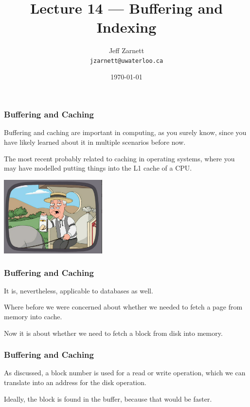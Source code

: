 

\title{Lecture 14 --- Buffering and Indexing }

\author{Jeff Zarnett \\ \small \texttt{jzarnett@uwaterloo.ca}}
\date{\today}




\begin{frame}
  \titlepage

 \end{frame}
 

\begin{frame}
\frametitle{Buffering and Caching}

Buffering and caching are important in computing, as you surely know, since you have likely learned about it in multiple scenarios before now. 

The most recent probably related to caching in operating systems, where you may have modelled putting things into the L1 cache of a CPU. 

\begin{center}
	\includegraphics[width=0.4\textwidth]{images/pfr.png}
\end{center}

 \end{frame}
 

\begin{frame}
\frametitle{Buffering and Caching}

It is, nevertheless, applicable to databases as well. 

Where before we were concerned about whether we needed to fetch a page from memory into cache. 

Now it is about whether we need to fetch a block from disk into memory.


\end{frame}

\begin{frame}
\frametitle{Buffering and Caching}

As discussed, a block number is used for a read or write operation, which we can translate into an address for the disk operation. 

Ideally, the block is found in the buffer, because that would be faster. 


\end{frame}

